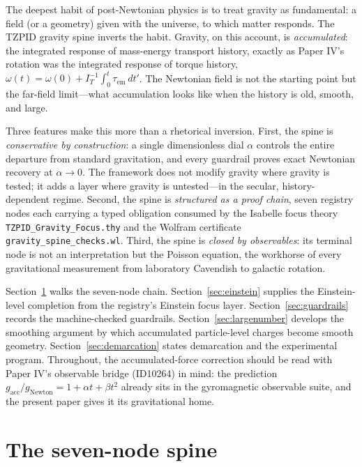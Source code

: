 \documentclass[11pt]{article}
\theoremstyle{remark}
\begin{document}
The deepest habit of post-Newtonian physics is to treat gravity as fundamental: a field (or a geometry) given with the universe, to which matter responds. The TZPID gravity spine inverts the habit. Gravity, on this account, is \emph{accumulated}: the integrated response of mass-energy transport history, exactly as Paper IV's rotation was the integrated response of torque history, $\omega(t) = \omega(0) + I_T^{-1}\int_0^t \tau_{\mathrm{em}}\,dt'$. The Newtonian field is not the starting point but the far-field limit---what accumulation looks like when the history is old, smooth, and large.

Three features make this more than a rhetorical inversion. First, the spine is \emph{conservative by construction}: a single dimensionless dial $\alpha$ controls the entire departure from standard gravitation, and every guardrail proves exact Newtonian recovery at $\alpha \to 0$. The framework does not modify gravity where gravity is tested; it adds a layer where gravity is untested---in the secular, history-dependent regime. Second, the spine is \emph{structured as a proof chain}, seven registry nodes each carrying a typed obligation consumed by the Isabelle focus theory \texttt{TZPID\_Gravity\_Focus.thy} and the Wolfram certificate \texttt{gravity\_spine\_checks.wl}. Third, the spine is \emph{closed by observables}: its terminal node is not an interpretation but the Poisson equation, the workhorse of every gravitational measurement from laboratory Cavendish to galactic rotation.

Section~\ref{sec:chain} walks the seven-node chain. Section~\ref{sec:einstein} supplies the Einstein-level completion from the registry's Einstein focus layer. Section~\ref{sec:guardrails} records the machine-checked guardrails. Section~\ref{sec:largenumber} develops the smoothing argument by which accumulated particle-level charges become smooth geometry. Section~\ref{sec:demarcation} states demarcation and the experimental program. Throughout, the accumulated-force correction should be read with Paper IV's observable bridge (ID10264) in mind: the prediction $g_{\mathrm{acc}}/g_{\mathrm{Newton}} = 1 + \alpha t + \beta t^2$ already sits in the gyromagnetic observable suite, and the present paper gives it its gravitational home.

\section{The seven-node spine}
\label{sec:chain}
\end{document}

